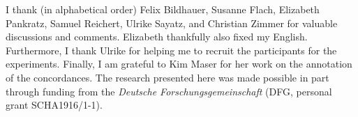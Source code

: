 \documentclass[USenglish]{article}
\begin{document}



\begin{acknowledgement}
  I thank (in alphabetical order) Felix Bildhauer, Susanne Flach, Elizabeth Pankratz, Samuel Reichert, Ulrike Sayatz, and Christian Zimmer for valuable discussions and comments.
  Elizabeth thankfully also fixed my English.
  Furthermore, I thank Ulrike for helping me to recruit the participants for the experiments.
  Finally, I am grateful to Kim Maser for her work on the annotation of the concordances.
  The research presented here was made possible in part through funding from the \textit{Deutsche Forschungsgemeinschaft} (DFG, personal grant SCHA1916/1-1).
\end{acknowledgement}






\end{document}
